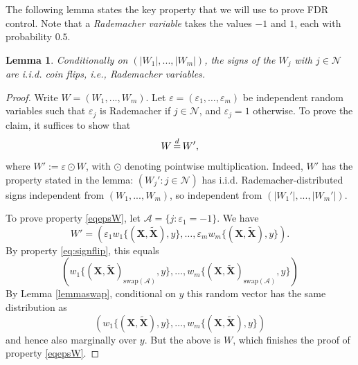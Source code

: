 \documentclass[11pt]{article}
\theoremstyle{plain}
\newtheorem{lemma}[theorem]{Lemma}
\theoremstyle{definition}
\newcommand{\N}{\mathcal{N}}
\newcommand{\A}{\mathcal{A}}
\newcommand{\citp}{\citep}
\begin{document}
The following lemma \citp[][p.561]{candes2018panning}  states the key property that we will use to prove FDR control. Note that a \emph{Rademacher variable} takes the values $-1$ and $1$, each with probability $0.5$.
\begin{lemma}\label{lemsignsradem}
Conditionally on $(|W_1|,...,|W_m|)$, the signs of the $W_j$ with $j\in \N$ are i.i.d. coin flips, i.e., Rademacher variables.
\end{lemma}


 \begin{proof}
 Write $W=(W_1,...,W_m)$.
Let $\varepsilon = (\varepsilon_1,\ldots,\varepsilon_m)$ be  independent random variables such that
$\varepsilon_j $ is Rademacher if $j \in \N$, and $\varepsilon_j = 1$ otherwise.
To prove the claim, it suffices to show that
\begin{equation} \label{eqepsW}
W \,{\buildrel d \over =}\, W',
\end{equation}
where $W':= \varepsilon \odot W$, with 
 $\odot$ denoting pointwise multiplication.  Indeed, $W'$ has the property stated in the lemma:
$(W_j':j\in \N)$ has i.i.d. Rademacher-distributed signs independent from $(W_1,...,W_m)$,  so independent from $(|W_1'|,...,|W_m'|)$.

To prove property \eqref{eqepsW}, let $\A = \{j: \varepsilon_1=-1\}$.
We have
$$W' = (\varepsilon_1w_1\big\{(\mathbf{X}, \tilde{\mathbf{X}}),y\big\},\ldots,\varepsilon_m w_m\big\{(\mathbf{X}, \tilde{\mathbf{X}}),y\big\} ). $$
By property  \eqref{eq:signflip}, this equals
$$ (w_1\big\{(\mathbf{X}, \tilde{\mathbf{X}})_{\text{swap}(\A)},y\big\},\ldots, w_m\big\{(\mathbf{X}, \tilde{\mathbf{X}})_{\text{swap}(\A)},y\big\} )  $$
By Lemma \ref{lemmaswap}, conditional on $y$ this random vector has the same distribution as 
$$ (w_1\big\{(\mathbf{X}, \tilde{\mathbf{X}}),y\big\},\ldots, w_m\big\{(\mathbf{X}, \tilde{\mathbf{X}}),y\big\} )  $$ and hence also marginally over $y$. But the above is $W$, which finishes the proof of property \eqref{eqepsW}.
\end{proof}
 
\end{document}
